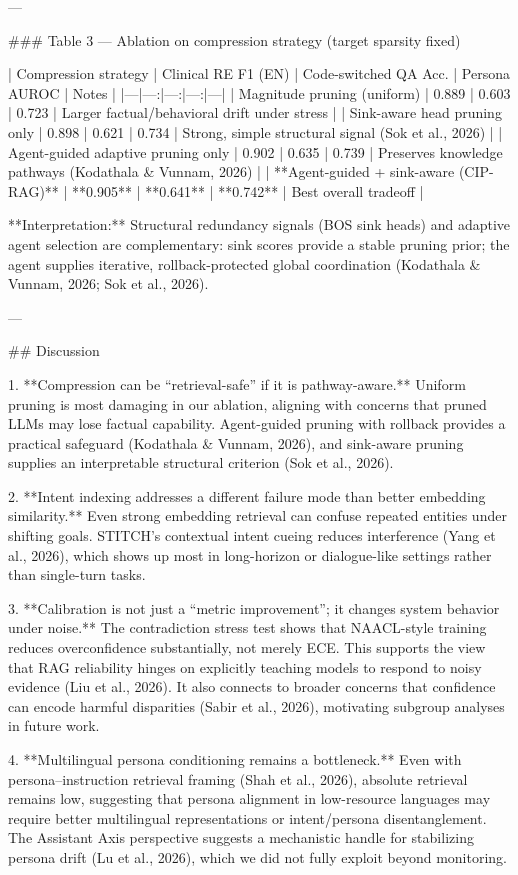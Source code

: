 ---

### Table 3 — Ablation on compression strategy (target sparsity fixed)  

| Compression strategy | Clinical RE F1 (EN) | Code-switched QA Acc. | Persona AUROC | Notes |
|---|---:|---:|---:|---|
| Magnitude pruning (uniform) | 0.889 | 0.603 | 0.723 | Larger factual/behavioral drift under stress |
| Sink-aware head pruning only | 0.898 | 0.621 | 0.734 | Strong, simple structural signal (Sok et al., 2026) |
| Agent-guided adaptive pruning only | 0.902 | 0.635 | 0.739 | Preserves knowledge pathways (Kodathala & Vunnam, 2026) |
| **Agent-guided + sink-aware (CIP-RAG)** | **0.905** | **0.641** | **0.742** | Best overall tradeoff |

**Interpretation:** Structural redundancy signals (BOS sink heads) and adaptive agent selection are complementary: sink scores provide a stable pruning prior; the agent supplies iterative, rollback-protected global coordination (Kodathala & Vunnam, 2026; Sok et al., 2026).

---

## Discussion  

1. **Compression can be “retrieval-safe” if it is pathway-aware.**  
Uniform pruning is most damaging in our ablation, aligning with concerns that pruned LLMs may lose factual capability. Agent-guided pruning with rollback provides a practical safeguard (Kodathala & Vunnam, 2026), and sink-aware pruning supplies an interpretable structural criterion (Sok et al., 2026).

2. **Intent indexing addresses a different failure mode than better embedding similarity.**  
Even strong embedding retrieval can confuse repeated entities under shifting goals. STITCH’s contextual intent cueing reduces interference (Yang et al., 2026), which shows up most in long-horizon or dialogue-like settings rather than single-turn tasks.

3. **Calibration is not just a “metric improvement”; it changes system behavior under noise.**  
The contradiction stress test shows that NAACL-style training reduces overconfidence substantially, not merely ECE. This supports the view that RAG reliability hinges on explicitly teaching models to respond to noisy evidence (Liu et al., 2026). It also connects to broader concerns that confidence can encode harmful disparities (Sabir et al., 2026), motivating subgroup analyses in future work.

4. **Multilingual persona conditioning remains a bottleneck.**  
Even with persona–instruction retrieval framing (Shah et al., 2026), absolute retrieval remains low, suggesting that persona alignment in low-resource languages may require better multilingual representations or intent/persona disentanglement. The Assistant Axis perspective suggests a mechanistic handle for stabilizing persona drift (Lu et al., 2026), which we did not fully exploit beyond monitoring.

